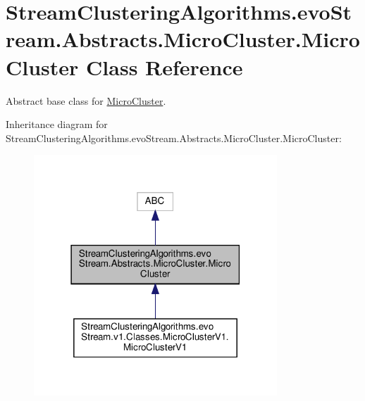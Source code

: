 \hypertarget{classStreamClusteringAlgorithms_1_1evoStream_1_1Abstracts_1_1MicroCluster_1_1MicroCluster}{}\section{Stream\+Clustering\+Algorithms.\+evo\+Stream.\+Abstracts.\+Micro\+Cluster.\+Micro\+Cluster Class Reference}
\label{classStreamClusteringAlgorithms_1_1evoStream_1_1Abstracts_1_1MicroCluster_1_1MicroCluster}


Abstract base class for \hyperlink{classStreamClusteringAlgorithms_1_1evoStream_1_1Abstracts_1_1MicroCluster_1_1MicroCluster}{Micro\+Cluster}.  




Inheritance diagram for Stream\+Clustering\+Algorithms.\+evo\+Stream.\+Abstracts.\+Micro\+Cluster.\+Micro\+Cluster\+:\nopagebreak
\begin{figure}[H]
\begin{center}
\leavevmode
\includegraphics[width=259pt]{classStreamClusteringAlgorithms_1_1evoStream_1_1Abstracts_1_1MicroCluster_1_1MicroCluster__inherit__graph}
\end{center}
\end{figure}


